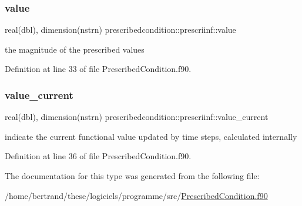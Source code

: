\subsubsection{\texorpdfstring{value}{value}}
{\footnotesize\ttfamily real(dbl), dimension(nstrn) prescribedcondition\+::prescriinf\+::value\hspace{0.3cm}{\ttfamily [private]}}



the magnitude of the prescribed values 



Definition at line 33 of file Prescribed\+Condition.\+f90.

\mbox{\label{structprescribedcondition_1_1prescriinf_adb8c3bfd5669cc2eccb447f24556ebaf}} 
\subsubsection{\texorpdfstring{value\+\_\+current}{value\_current}}
{\footnotesize\ttfamily real(dbl), dimension(nstrn) prescribedcondition\+::prescriinf\+::value\+\_\+current\hspace{0.3cm}{\ttfamily [private]}}



indicate the current functional value updated by time steps, calculated internally 



Definition at line 36 of file Prescribed\+Condition.\+f90.



The documentation for this type was generated from the following file\+:\begin{DoxyCompactItemize}
\item 
/home/bertrand/these/logiciels/programme/src/\hyperlink{_prescribed_condition_8f90}{Prescribed\+Condition.\+f90}\end{DoxyCompactItemize}
